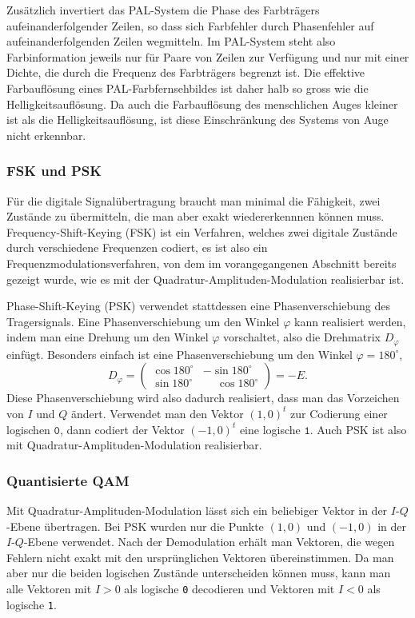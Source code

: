 Zusätzlich invertiert das PAL-System die Phase des Farbträgers
aufeinanderfolgender Zeilen, so dass sich Farbfehler durch Phasenfehler
auf aufeinanderfolgenden Zeilen wegmitteln.
Im PAL-System steht also Farbinformation jeweils nur für Paare von Zeilen
zur Verfügung und nur mit einer Dichte, die durch die Frequenz des Farbträgers
begrenzt ist.
Die effektive Farbauflösung eines PAL-Farbfernsehbildes ist daher halb so
gross wie die Helligkeitsauflösung.
Da auch die Farbauflösung des menschlichen Auges kleiner ist als die
Helligkeitsauflösung, ist diese Einschränkung des Systems von Auge nicht 
erkennbar.

\subsubsection{FSK und PSK}
Für die digitale Signalübertragung braucht man minimal die Fähigkeit,
zwei Zustände zu übermitteln, die man aber exakt wiedererkennnen können muss.
Frequency-Shift-Keying (FSK) ist ein Verfahren, welches zwei digitale Zustände
durch verschiedene Frequenzen codiert, es ist also ein
Frequenzmodulationsverfahren, von dem im vorangegangenen Abschnitt
bereits gezeigt wurde, wie es mit der Quadratur-Amplituden-Modulation
realisierbar ist.

Phase-Shift-Keying (PSK) verwendet stattdessen eine Phasenverschiebung
des Tragersignals.
Eine Phasenverschiebung um den Winkel $\varphi$ kann realisiert werden,
indem man eine Drehung um den Winkel $\varphi$ vorschaltet, also die
Drehmatrix $D_{\varphi}$ einfügt.
Besonders einfach ist eine Phasenverschiebung um den Winkel
$\varphi=180^\circ$, 
\[
D_{\varphi}
=
\begin{pmatrix}
\cos180^\circ&          - \sin180^\circ \\
\sin180^\circ& \phantom{-}\cos180^\circ
\end{pmatrix}
=
-E.
\]
Diese Phasenverschiebung wird also dadurch realisiert, dass man das
Vorzeichen von $I$ und $Q$ ändert.
Verwendet man den Vektor $(1,0)^t$ zur Codierung einer logischen
$\texttt{0}$, dann codiert der Vektor $(-1,0)^t$ eine logische $\texttt{1}$.
Auch PSK ist also mit Quadratur-Amplituden-Modulation realisierbar.

\subsubsection{Quantisierte QAM}
Mit Quadratur-Amplituden-Modulation lässt sich ein beliebiger Vektor
in der $I$-$Q$-Ebene übertragen.
Bei PSK wurden nur die Punkte $(1,0)$  und $(-1,0)$ in der $I$-$Q$-Ebene
verwendet.
Nach der Demodulation erhält man Vektoren, die wegen Fehlern nicht
exakt mit den ursprünglichen Vektoren übereinstimmen.
Da man aber nur die beiden logischen Zustände unterscheiden können muss,
kann man alle Vektoren mit $I>0$ als logische \texttt{0} decodieren
und Vektoren mit $I<0$ als logische \texttt{1}.

